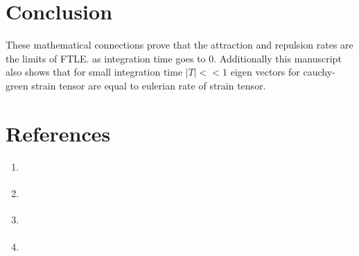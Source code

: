 \documentclass[../report.tex]{subfiles}
\begin{document}
\chapter{Conclusion}

These mathematical connections prove that the attraction and repulsion rates are the limits of FTLE. as integration time goes to 0. Additionally this manuscript also shows that for small integration time \(|T| << 1\) eigen vectors for cauchy-green strain tensor are equal to eulerian rate of strain tensor.

{\let\clearpage\relax \chapter*{References}}
\begin{enumerate}
  \setlength\itemsep{1em}
  \item \href{http://essay.utwente.nl/61677/1/internship_report_zeekant_s.pdf}{}

  \item \href{http://www.dept.aoe.vt.edu/~sdross/papers/nolan-2019-thesis.pdfz}{}

  \item \href{https://www.annualreviews.org/doi/abs/10.1146/annurev-fluid-010313-141322?journalCode=fluid}{}

  \item \href{http://citeseerx.ist.psu.edu/viewdoc/download?doi=10.1.1.120.439&rep=rep1&type=pdf}{}
\end{enumerate}
\end{document}
